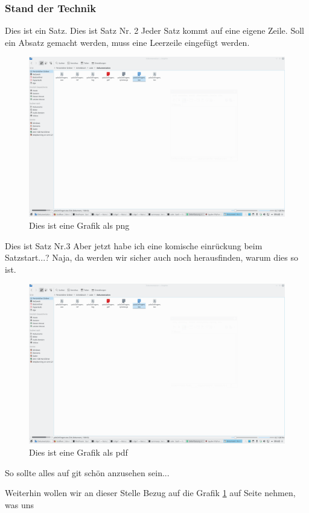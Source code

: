 \documentclass[a4paper,12pt]{article}
\begin{document}
\subsubsection{Stand der Technik}
\label{subsubsec:Stand der Technik}
Dies ist ein Satz.
Dies ist Satz Nr. 2
Jeder Satz kommt auf eine eigene Zeile.
Soll ein Absatz gemacht werden, muss eine Leerzeile eingefügt werden.
\begin{figure}
	\centering
	\includegraphics[scale=0.25]{BilderEinleitung/bild.pdf}
	\caption{Dies ist eine Grafik als png}
	\label{img:grafik-dummy1}
\end{figure}

Dies ist Satz Nr.3
Aber jetzt habe ich eine komische einrückung beim Satzstart...?
Naja, da werden wir sicher auch noch herausfinden, warum dies so ist.
\begin{figure}
	\centering
	\includegraphics[scale=0.2]{BilderEinleitung/bild.png}
	\caption{Dies ist eine Grafik als pdf}
	\label{img:grafik-dummy2}
\end{figure}
	

So sollte alles auf git schön anzusehen sein...

Weiterhin wollen wir an dieser Stelle Bezug auf die Grafik
\ref{img:grafik-dummy1} auf Seite \pageref{img:grafik-dummy1} nehmen, was uns
\end{document}
